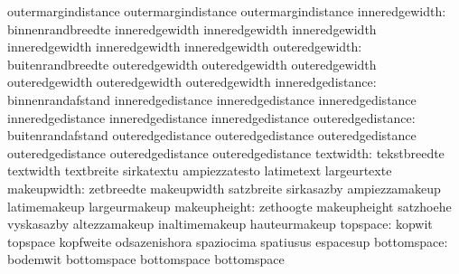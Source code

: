                                   outermargindistance              outermargindistance
                                  outermargindistance
                inneredgewidth:   binnenrandbreedte                inneredgewidth
                                  inneredgewidth                   inneredgewidth
                                  inneredgewidth                   inneredgewidth
                                  inneredgewidth
                outeredgewidth:   buitenrandbreedte                outeredgewidth
                                  outeredgewidth                   outeredgewidth
                                  outeredgewidth                   outeredgewidth
                                  outeredgewidth
               inneredgedistance: binnenrandafstand                inneredgedistance
                                  inneredgedistance                inneredgedistance
                                  inneredgedistance                inneredgedistance
                                  inneredgedistance
               outeredgedistance: buitenrandafstand                outeredgedistance
                                  outeredgedistance                outeredgedistance
                                  outeredgedistance                outeredgedistance
                                  outeredgedistance
                       textwidth: tekstbreedte                     textwidth
                                  textbreite                       sirkatextu
                                  ampiezzatesto                    latimetext
                                  largeurtexte
                     makeupwidth: zetbreedte                       makeupwidth
                                  satzbreite                       sirkasazby
                                  ampiezzamakeup                   latimemakeup
                                  largeurmakeup
                    makeupheight: zethoogte                        makeupheight
                                  satzhoehe                        vyskasazby
                                  altezzamakeup                    inaltimemakeup
                                  hauteurmakeup
                        topspace: kopwit                           topspace
                                  kopfweite                        odsazenishora
                                  spaziocima                       spatiusus
                                  espacesup
                     bottomspace: bodemwit                         bottomspace
                                  bottomspace                      bottomspace
